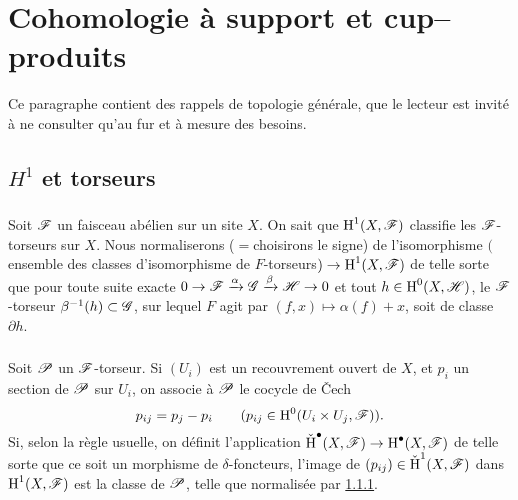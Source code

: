 \section{Cohomologie à support et cup--produits}\label{IV:1}

Ce paragraphe contient des rappels de topologie générale, que le 
lecteur est invité à ne consulter qu'au fur et à mesure des besoins.










\subsection{\texorpdfstring{$H^1$}{H1} et torseurs}\label{IV:1-1}





\subsubsection{}\label{IV:1-1-1}

Soit $\mathscr{F}$ un faisceau abélien sur un site $X$. On sait que $\operatorname{H}^1(X,\mathscr{F})$ 
classifie les $\mathscr{F}$-torseurs sur $X$. Nous normaliserons ($=$choisirons le 
signe) de l'isomorphisme $($ensemble des classes d'isomorphisme de 
$F$-torseurs$)\to \operatorname{H}^1(X,\mathscr{F})$ de telle sorte que pour toute suite exacte 
$0\to \mathscr{F}\xrightarrow\alpha\mathscr{G}\xrightarrow\beta\mathscr{H}\to 0$ et tout 
$h\in\operatorname{H}^0(X,\mathscr{H})$, le $\mathscr{F}$-torseur $\beta^{-1}(h)\subset \mathscr{G}$, sur lequel 
$F$ agit par $(f,x)\mapsto \alpha(f)+x$, soit de classe $\partial h$. 





\subsubsection{}\label{IV:1-1-2}

Soit $\mathscr{P}$ un $\mathscr{F}$-torseur. Si $(U_i)$ est un recouvrement ouvert de $X$, et 
$p_i$ un section de $\mathscr{P}$ sur $U_i$, on associe à $\mathscr{P}$ le cocycle de 
\v{C}ech
\[
  p_{i j} = p_j - p_i \qquad \text{($p_{i j}\in \operatorname{H}^0(U_i\times U_j,\mathscr{F})$).}
\]
Si, selon la règle usuelle, on définit l'application 
$\operatorname{\check H}^\bullet(X,\mathscr{F})\to \operatorname{H}^\bullet(X,\mathscr{F})$ de telle sorte 
que ce soit un morphisme de $\delta$-foncteurs, l'image de 
$(p_{i j})\in \operatorname{\check H}^1(X,\mathscr{F})$ dans $\operatorname{H}^1(X,\mathscr{F})$ est la 
classe de $\mathscr{P}$, telle que normalisée par \ref{IV:1-1-1}. 






